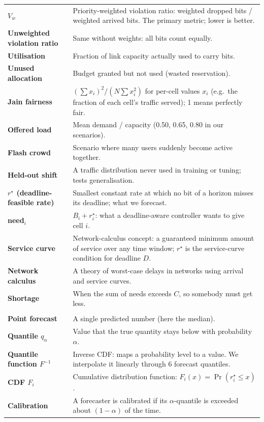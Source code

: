 \documentclass[11pt,a4paper]{article}
\newcommand{\rstar}{r^\star}
\begin{document}
\begin{longtable}{>{\raggedright\arraybackslash\bfseries}p{3.6cm}>{\raggedright\arraybackslash}p{12.2cm}}
$V_w$ & Priority-weighted violation ratio: weighted dropped bits / weighted arrived bits. The primary metric; lower is better. \\
Unweighted violation ratio & Same without weights: all bits count equally. \\
Utilisation & Fraction of link capacity actually used to carry bits. \\
Unused allocation & Budget granted but not used (wasted reservation). \\
Jain fairness & $(\sum x_i)^2/(N\sum x_i^2)$ for per-cell values $x_i$ (e.g.\ the fraction of each cell's traffic served); 1 means perfectly fair. \\
Offered load & Mean demand / capacity (0.50, 0.65, 0.80 in our scenarios). \\
Flash crowd & Scenario where many users suddenly become active together. \\
Held-out shift & A traffic distribution never used in training or tuning; tests generalisation. \\
$\rstar$ (deadline-feasible rate) & Smallest constant rate at which no bit of a horizon misses its deadline; what we forecast. \\
need$_i$ & $B_i + \rstar_i$: what a deadline-aware controller wants to give cell $i$. \\
Service curve & Network-calculus concept: a guaranteed minimum amount of service over any time window; $\rstar$ is the service-curve condition for deadline $D$. \\
Network calculus & A theory of worst-case delays in networks using arrival and service curves. \\
Shortage & When the sum of needs exceeds $C$, so somebody must get less. \\
\multicolumn{2}{l}{\color{iitblue}\normalsize\textbf{Forecasting and machine learning}}\\
Point forecast & A single predicted number (here the median). \\
Quantile $q_\alpha$ & Value that the true quantity stays below with probability $\alpha$. \\
Quantile function $F^{-1}$ & Inverse CDF: maps a probability level to a value. We interpolate it linearly through 6 forecast quantiles. \\
CDF $F_i$ & Cumulative distribution function: $F_i(x) = \Pr(\rstar_i \le x)$. \\
Calibration & A forecaster is calibrated if its $\alpha$-quantile is exceeded about $(1-\alpha)$ of the time. \\

\end{longtable}
\end{document}
